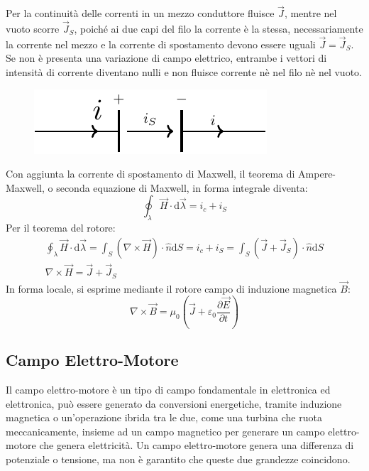 \documentclass{article}
\newcommand{\df}{\mathrm{d}}
\numberwithin{equation}{subsection}
\begin{document}
Per la continuità delle correnti in un mezzo conduttore fluisce $\vec{J}$, mentre nel vuoto scorre $\vec{J}_S$, poiché ai due capi del filo la corrente è la stessa, necessariamente 
la corrente nel mezzo e la corrente di spostamento devono essere uguali $\vec{J}=\vec{J}_S$. Se non è presenta una variazione di campo elettrico, entrambe i vettori 
di intensità di corrente diventano nulli e non fluisce corrente nè nel filo nè nel vuoto.  

\begin{figure}[H]%
    \centering
    \includegraphics{corrente-filo-reciso.pdf}
    \label{fig:corrente-filo-reciso}
\end{figure}

Con aggiunta la corrente di spostamento di Maxwell, il teorema di Ampere-Maxwell, o seconda equazione di Maxwell, in forma integrale diventa:
\begin{equation*}
    \oint_{\lambda}\vec{H}\cdot \df\vec{\lambda}=i_c+i_S
\end{equation*}
Per il teorema del rotore:
\begin{gather*}
    \displaystyle\oint_{\lambda}\vec{H}\cdot \df\vec{\lambda}=\int_S(\nabla\times\vec{H})\cdot\hat{n}\df S=i_c+i_S=\int_S(\vec{J}+\vec{J}_S)\cdot\hat{n}\df S\\
    \nabla\times\vec{H}=\vec{J}+\vec{J}_S
\end{gather*}
In forma locale, si esprime mediante il rotore campo di induzione magnetica $\vec{B}$:
\begin{equation}
    \nabla\times\vec{B}=\mu_0\left(\vec{J}+\varepsilon_0\displaystyle\frac{\partial \vec{E}}{\partial t}\right)
\end{equation}

\subsection{Campo Elettro-Motore}

Il campo elettro-motore è un tipo di campo fondamentale in elettronica ed elettronica, può essere generato da conversioni energetiche, tramite induzione magnetica o un'operazione 
ibrida tra le due, come una turbina che ruota meccanicamente, insieme ad un campo magnetico per generare un campo elettro-motore che genera elettricità. Un campo elettro-motore 
genera una differenza di potenziale o tensione, ma non è garantito che queste due grandezze coincidono. 
\end{document}
